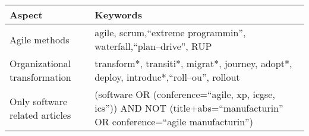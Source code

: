 \centering
{} \label{keywordtable}
\begin{tabular}{l p{30em}}
    \bfseries{Aspect} & \bfseries{Keywords} \\
    \hline
    Agile methods & agile, scrum,``extreme programmin'', waterfall,``plan–drive'', RUP \\
    Organizational transformation & transform*, transiti*, migrat*, journey, adopt*, deploy, introduc*,``roll–ou'', rollout \\
    Only software related articles & (software OR (conference=``agile, xp, icgse, ics'')) AND NOT (title+abs=``manufacturin'' OR conference=``agile manufacturin'') \\
\end{tabular}

\justify
